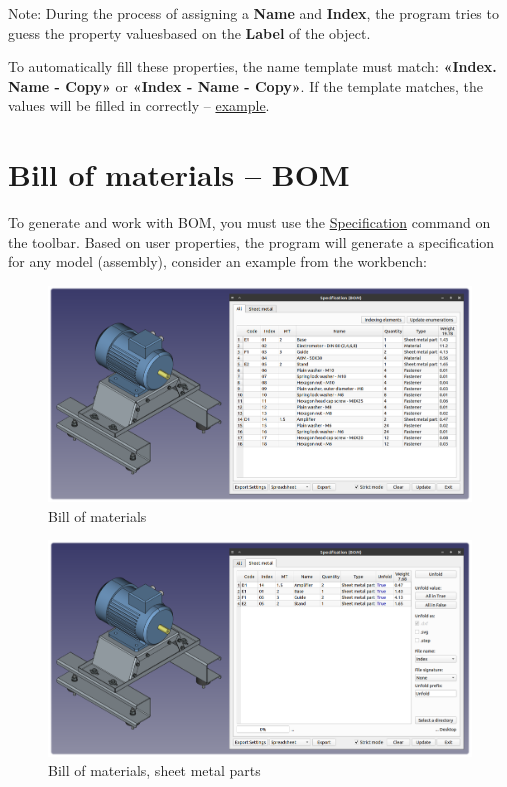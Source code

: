 \documentclass[a4paper,12pt]{article}
\begin{document}
Note: During the process of assigning a \textbf{Name} and \textbf{Index}, the program tries to guess the property values ​​based on the \textbf{Label} of the object.

To automatically fill these properties, the name template must match: \textbf{«Index. Name - Copy»} or \textbf{«Index - Name - Copy»}. If the template matches, the values ​​will be filled in correctly -- \hyperref[sec:properties]{example}.

\pagebreak




\section{Bill of materials -- BOM}

To generate and work with BOM, you must use the \hyperref[sec:4]{Specification} command on the toolbar. Based on user properties, the program will generate a specification for any model (assembly), consider an example from the workbench:

\begin{figure}[htp]
	\centering
	\includegraphics[width=1\textwidth]{img/specification_all.png}
	\caption{Bill of materials}
	\label{sec:specification_all}
\end{figure}

\begin{figure}[htp]
	\centering
	\includegraphics[width=1\textwidth]{img/specification_sm.png}
	\caption{Bill of materials, sheet metal parts}
	\label{sec:specification_sm}
\end{figure}
\end{document}
